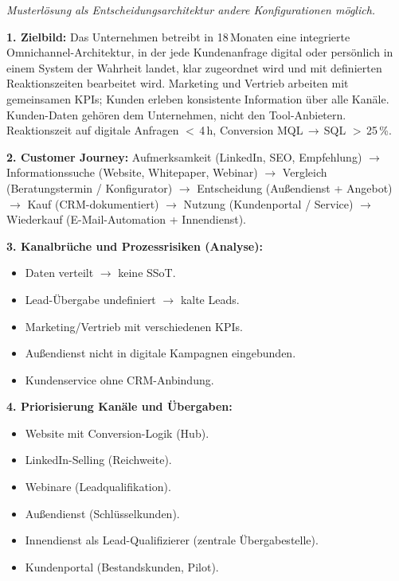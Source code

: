 \documentclass[11pt,a4paper,oneside]{article}
\begin{document}
\begin{loesungbox}
\emph{Musterlösung als Entscheidungsarchitektur \textendash{} andere Konfigurationen möglich.}

\smallskip
\textbf{1. Zielbild:}
Das Unternehmen betreibt in 18\,Monaten eine integrierte Omnichannel-Architektur, in der jede Kundenanfrage \textendash{} digital oder persönlich \textendash{} in einem System der Wahrheit landet, klar zugeordnet wird und mit definierten Reaktionszeiten bearbeitet wird. Marketing und Vertrieb arbeiten mit gemeinsamen KPIs; Kunden erleben konsistente Information über alle Kanäle. Kunden-Daten gehören dem Unternehmen, nicht den Tool-Anbietern. Reaktionszeit auf digitale Anfragen $<$\,4\,h, Conversion MQL\,$\rightarrow$\,SQL $>$\,25\,\%.

\textbf{2. Customer Journey:}
Aufmerksamkeit (LinkedIn, SEO, Empfehlung) $\rightarrow$ Informationssuche (Website, Whitepaper, Webinar) $\rightarrow$ Vergleich (Beratungstermin / Konfigurator) $\rightarrow$ Entscheidung (Außendienst + Angebot) $\rightarrow$ Kauf (CRM-dokumentiert) $\rightarrow$ Nutzung (Kundenportal / Service) $\rightarrow$ Wiederkauf (E-Mail-Automation + Innendienst).

\textbf{3. Kanalbrüche und Prozessrisiken (Analyse):}
\begin{itemize}
  \item Daten verteilt $\rightarrow$ keine SSoT.
  \item Lead-Übergabe undefiniert $\rightarrow$ kalte Leads.
  \item Marketing/Vertrieb mit verschiedenen KPIs.
  \item Außendienst nicht in digitale Kampagnen eingebunden.
  \item Kundenservice ohne CRM-Anbindung.
\end{itemize}

\textbf{4. Priorisierung Kanäle und Übergaben:}
\begin{itemize}
  \item Website mit Conversion-Logik (Hub).
  \item LinkedIn-Selling (Reichweite).
  \item Webinare (Leadqualifikation).
  \item Außendienst (Schlüsselkunden).
  \item Innendienst als Lead-Qualifizierer (zentrale Übergabestelle).
  \item Kundenportal (Bestandskunden, Pilot).
\end{itemize}


\end{loesungbox}
\end{document}
